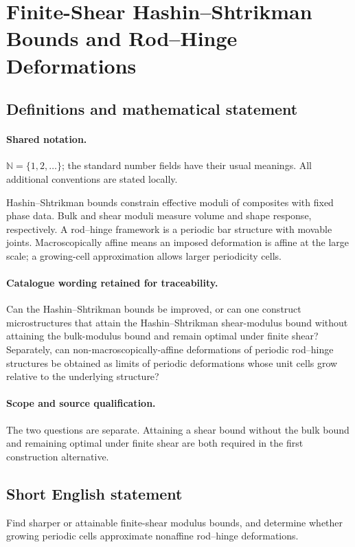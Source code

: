 \documentclass[11pt]{article}
\begin{document}
\section{Finite-Shear Hashin–Shtrikman Bounds and Rod–Hinge Deformations}\label{statement}

\subsection{Definitions and mathematical statement}

\paragraph{Shared notation.}$\mathbb N=\{1,2,\ldots\}$; the standard number fields have their usual meanings. All additional conventions are stated locally.


Hashin--Shtrikman bounds constrain effective moduli of composites with fixed phase data. Bulk and shear moduli measure volume and shape response, respectively. A rod--hinge framework is a periodic bar structure with movable joints. Macroscopically affine means an imposed deformation is affine at the large scale; a growing-cell approximation allows larger periodicity cells.

\paragraph{Catalogue wording retained for traceability.}
Can the Hashin–Shtrikman bounds be improved, or can one construct microstructures that attain the Hashin–Shtrikman shear-modulus bound without attaining the bulk-modulus bound and remain optimal under finite shear? Separately, can non-macroscopically-affine deformations of periodic rod–hinge structures be obtained as limits of periodic deformations whose unit cells grow relative to the underlying structure?

\paragraph{Scope and source qualification.}The two questions are separate. Attaining a shear bound without the bulk bound and remaining optimal under finite shear are both required in the first construction alternative.
\subsection{Short English statement}
Find sharper or attainable finite-shear modulus bounds, and determine whether growing periodic cells approximate nonaffine rod--hinge deformations.
\end{document}
